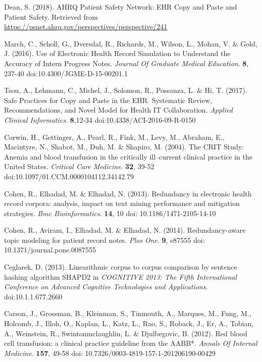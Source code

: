 \documentclass[runningheads,a4paper]{llncs}
\begin{document}
\begin{thebibliography}{50}
%
%

Dean, S. (2018). AHRQ Patient Safety Network: EHR Copy and Paste and Patient Safety. Retrieved from \url{https://psnet.ahrq.gov/perspectives/perspective/241}

March, C., Scholl, G., Dversdal, R., Richards, M., Wilson, L., Mohan, V. \& Gold, J. (2016). Use of Electronic Health Record Simulation to Understand the Accuracy of Intern Progress Notes.  {\em Journal Of Graduate Medical Education}. \textbf{8}, 237-40  doi:10.4300/JGME-D-15-00201.1

Tsou, A., Lehmann, C., Michel, J., Solomon, R., Possanza, L. \& Hi, T. (2017). Safe Practices for Copy and Paste in the EHR. Systematic Review, Recommendations, and Novel Model for Health IT Collaboration. {\em Applied Clinical Informatics}. \textbf{8},12-34 doi:10.4338/ACI-2016-09-R-0150

Corwin, H., Gettinger, A., Pearl, R., Fink, M., Levy, M., Abraham, E., Macintyre, N., Shabot, M., Duh, M. \& Shapiro, M. (2004). The CRIT Study: Anemia and blood transfusion in the critically ill--current clinical practice in the United States. {\em Critical Care Medicine}. \textbf{32}, 39-52 doi:10.1097/01.CCM.0000104112.34142.79

Cohen, R., Elhadad, M. \& Elhadad, N. (2013). Redundancy in electronic health record corpora: analysis, impact on text mining performance and mitigation strategies.  {\em Bmc Bioinformatics}. \textbf{14}, 10 doi: 10.1186/1471-2105-14-10

Cohen, R., Aviram, I., Elhadad, M. \& Elhadad, N. (2014). Redundancy-aware topic modeling for patient record notes. {\em Plos One}. \textbf{9}, e87555 doi: 10.1371/journal.pone.0087555

Ceglarek, D. (2013). Linearithmic corpus to corpus comparison by sentence hashing algorithm SHAPD2 in {\em COGNITIVE 2013: The Fifth International Conference on Advanced Cognitive Technologies and Applications}. doi:10.1.1.677.2660

Carson, J., Grossman, B., Kleinman, S., Tinmouth, A., Marques, M., Fung, M., Holcomb, J., Illoh, O., Kaplan, L., Katz, L., Rao, S., Roback, J., Er, A., Tobian, A., Weinstein, R., Swintonmclaughlin, L. \& Djulbegovic, B. (2012). Red blood cell transfusion: a clinical practice guideline from the AABB*.  {\em Annals Of Internal Medicine}. \textbf{157}, 49-58  doi: 10.7326/0003-4819-157-1-201206190-00429


\end{thebibliography}
\end{document}
